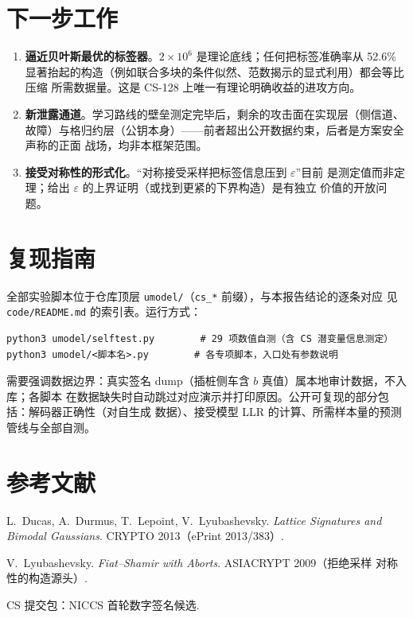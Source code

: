 \documentclass[UTF8,11pt,a4paper]{ctexart}
\newcommand{\code}[1]{\texttt{\small #1}}
\begin{document}
\section{下一步工作}

\begin{enumerate}
\item \textbf{逼近贝叶斯最优的标签器}。$2\times10^6$ 是理论底线；任何把标签准确率从
  52.6\% 显著抬起的构造（例如联合多块的条件似然、范数揭示的显式利用）都会等比压缩
  所需数据量。这是 CS-128 上唯一有理论明确收益的进攻方向。
\item \textbf{新泄露通道}。学习路线的壁垒测定完毕后，剩余的攻击面在实现层（侧信道、
  故障）与格归约层（公钥本身）——前者超出公开数据约束，后者是方案安全声称的正面
  战场，均非本框架范围。
\item \textbf{接受对称性的形式化}。``对称接受采样把标签信息压到 $\varepsilon$''目前
  是测定值而非定理；给出 $\varepsilon$ 的上界证明（或找到更紧的下界构造）是有独立
  价值的开放问题。
\end{enumerate}

\section{复现指南}

全部实验脚本位于仓库顶层 \code{umodel/}（\code{cs\_*} 前缀），与本报告结论的逐条对应
见 \code{code/README.md} 的索引表。运行方式：
\begin{verbatim}
python3 umodel/selftest.py        # 29 项数值自测（含 CS 潜变量信息测定）
python3 umodel/<脚本名>.py        # 各专项脚本，入口处有参数说明
\end{verbatim}
需要强调数据边界：真实签名 dump（插桩侧车含 $b$ 真值）属本地审计数据，不入库；各脚本
在数据缺失时自动跳过对应演示并打印原因。公开可复现的部分包括：解码器正确性（对自生成
数据）、接受模型 LLR 的计算、所需样本量的预测管线与全部自测。

\section*{参考文献}
\begin{enumerate}[label={[\arabic*]}]
\item L.~Ducas, A.~Durmus, T.~Lepoint, V.~Lyubashevsky. \emph{Lattice Signatures and
  Bimodal Gaussians}. CRYPTO 2013（ePrint 2013/383）.
\item V.~Lyubashevsky. \emph{Fiat--Shamir with Aborts}. ASIACRYPT 2009（拒绝采样
  对称性的构造源头）.
\item CS 提交包：NICCS 首轮数字签名候选.
\end{enumerate}
\end{document}
